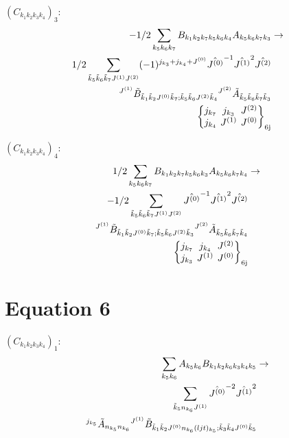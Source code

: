 \documentclass[11pt]{article}
\newcommand{\sixj}[6]{\begingroup\setlength{\arraycolsep}{0.2em}\begin{Bmatrix} #1 & #2 & #3 \\ #4 & #5 & #6 \end{Bmatrix}_{\text{6j}}\endgroup}
\begin{document}
$\left({C}_{{k}_{1}{k}_{2}{k}_{3}{k}_{4}}\right)_{3}$:
\begin{align}
-1/2\sum_{{k}_{5}{k}_{6}{k}_{7}}{B}_{{k}_{1}{k}_{2}{k}_{7}{k}_{5}{k}_{6}{k}_{4}}{A}_{{k}_{5}{k}_{6}{k}_{7}{k}_{3}}&\rightarrow \notag \\1/2\sum_{\tilde{k}_{5}\tilde{k}_{6}\tilde{k}_{7}J^{(1)}J^{(2)}}(-1)^{j_{{k}_{3}} +j_{{k}_{4}} +J^{(0)} }\hat{J^{(0)}}^{-1}\hat{J^{(1)}}^{2}\hat{J^{(2)}}& \notag \\{}^{J^{(1)}}\tilde{B}_{\tilde{k}_{1}\tilde{k}_{2}J^{(0)}\tilde{k}_{7};\tilde{k}_{5}\tilde{k}_{6}J^{(2)}\tilde{k}_{4}}{}^{J^{(2)}}\tilde{A}_{\tilde{k}_{5}\tilde{k}_{6}\tilde{k}_{7}\tilde{k}_{3}}& \notag \\\sixj{j_{{k}_{7}}}{j_{{k}_{3}}}{J^{(2)}}{j_{{k}_{4}}}{J^{(1)}}{J^{(0)}}
\end{align}

$\left({C}_{{k}_{1}{k}_{2}{k}_{3}{k}_{4}}\right)_{4}$:
\begin{align}
1/2\sum_{{k}_{5}{k}_{6}{k}_{7}}{B}_{{k}_{1}{k}_{2}{k}_{7}{k}_{5}{k}_{6}{k}_{3}}{A}_{{k}_{5}{k}_{6}{k}_{7}{k}_{4}}&\rightarrow \notag \\-1/2\sum_{\tilde{k}_{5}\tilde{k}_{6}\tilde{k}_{7}J^{(1)}J^{(2)}}\hat{J^{(0)}}^{-1}\hat{J^{(1)}}^{2}\hat{J^{(2)}}& \notag \\{}^{J^{(1)}}\tilde{B}_{\tilde{k}_{1}\tilde{k}_{2}J^{(0)}\tilde{k}_{7};\tilde{k}_{5}\tilde{k}_{6}J^{(2)}\tilde{k}_{3}}{}^{J^{(2)}}\tilde{A}_{\tilde{k}_{5}\tilde{k}_{6}\tilde{k}_{7}\tilde{k}_{4}}& \notag \\\sixj{j_{{k}_{7}}}{j_{{k}_{4}}}{J^{(2)}}{j_{{k}_{3}}}{J^{(1)}}{J^{(0)}}
\end{align}

\section{Equation 6}
$\left({C}_{{k}_{1}{k}_{2}{k}_{3}{k}_{4}}\right)_{1}$:
\begin{align}
\sum_{{k}_{5}{k}_{6}}{A}_{{k}_{5}{k}_{6}}{B}_{{k}_{1}{k}_{2}{k}_{6}{k}_{3}{k}_{4}{k}_{5}}&\rightarrow \notag \\\sum_{\tilde{k}_{5}n_{{k}_{6}}J^{(1)}}\hat{J^{(0)}}^{-2}\hat{J^{(1)}}^{2}& \notag \\{}^{j_{{k}_{5}}}\tilde{A}_{n_{{k}_{5}}n_{{k}_{6}}}{}^{J^{(1)}}\tilde{B}_{\tilde{k}_{1}\tilde{k}_{2}J^{(0)}n_{{k}_{6}}(ljt)_{{k}_{5}};\tilde{k}_{3}\tilde{k}_{4}J^{(0)}\tilde{k}_{5}}& \notag \\
\end{align}
\end{document}

